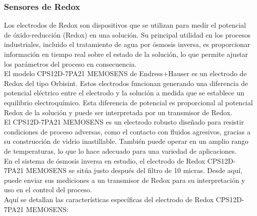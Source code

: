 \subsubsection{Sensores de Redox}

Los electrodos de Redox son dispositivos que se utilizan para medir el potencial de óxido-reducción (Redox) en una solución. Su principal utilidad en los procesos industriales, incluido el tratamiento de agua por ósmosis inversa, es proporcionar información en tiempo real sobre el estado de la solución, lo que permite ajustar los parámetros del proceso en consecuencia.\\

El modelo CPS12D-7PA21 MEMOSENS de Endress+Hauser es un electrodo de Redox del tipo Orbisint. Estos electrodos funcionan generando una diferencia de potencial eléctrico entre el electrodo y la solución a medida que se establece un equilibrio electroquímico. Esta diferencia de potencial es proporcional al potencial Redox de la solución y puede ser interpretada por un transmisor de Redox.\\

El CPS12D-7PA21 MEMOSENS es un electrodo robusto diseñado para resistir condiciones de proceso adversas, como el contacto con fluidos agresivos, gracias a su construcción de vidrio inastillable. También puede operar en un amplio rango de temperaturas, lo que lo hace adecuado para una variedad de aplicaciones.\\

En el sistema de ósmosis inversa en estudio, el electrodo de Redox CPS12D-7PA21 MEMOSENS se sitúa justo después del filtro de 10 micras. Desde aquí, puede enviar sus mediciones a un transmisor de Redox para su interpretación y uso en el control del proceso.\\

Aquí se detallan las características específicas del electrodo de Redox CPS12D-7PA21 MEMOSENS:\\

